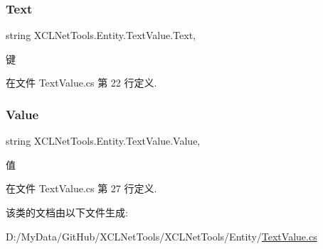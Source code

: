 \subsubsection{\texorpdfstring{Text}{Text}}
{\footnotesize\ttfamily string X\+C\+L\+Net\+Tools.\+Entity.\+Text\+Value.\+Text\hspace{0.3cm}{\ttfamily [get]}, {\ttfamily [set]}}



键 



在文件 Text\+Value.\+cs 第 22 行定义.

\mbox{\label{class_x_c_l_net_tools_1_1_entity_1_1_text_value_a8a193486b942adc898433bd29db3eff7}} 
\subsubsection{\texorpdfstring{Value}{Value}}
{\footnotesize\ttfamily string X\+C\+L\+Net\+Tools.\+Entity.\+Text\+Value.\+Value\hspace{0.3cm}{\ttfamily [get]}, {\ttfamily [set]}}



值 



在文件 Text\+Value.\+cs 第 27 行定义.



该类的文档由以下文件生成\+:\begin{DoxyCompactItemize}
\item 
D\+:/\+My\+Data/\+Git\+Hub/\+X\+C\+L\+Net\+Tools/\+X\+C\+L\+Net\+Tools/\+Entity/\hyperlink{_text_value_8cs}{Text\+Value.\+cs}\end{DoxyCompactItemize}
